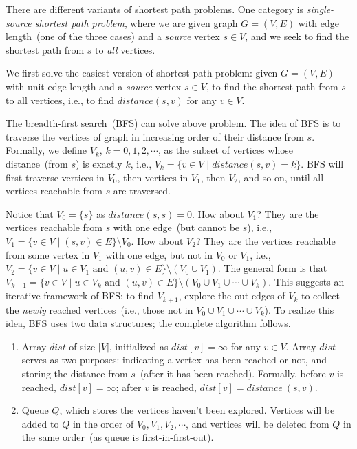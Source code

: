 There are different variants of shortest path problems.
One category is \emph{single-source shortest path problem}, where
we are given graph $G = (V, E)$ with edge length~(one of the three cases)
and a \emph{source} vertex $s\in V$, and we seek to find the shortest
path from $s$ to \emph{all} vertices.


We first solve the easiest version of shortest path problem: 
given $G = (V, E)$ with unit edge length and a \emph{source} vertex $s\in V$,
to find the shortest path from $s$ to all vertices, i.e., to find $distance(s, v)$ for any $v\in V$.

The breadth-first search~(BFS) can solve above problem. The idea of BFS
is to traverse the vertices of graph in increasing order of their distance from $s$.
Formally, we define $V_k$, $k = 0, 1, 2, \cdots$, as the subset of
vertices whose distance~(from $s$) is exactly $k$, i.e., $V_k = \{v \in V \mid distance(s, v) = k\}$.
BFS will first traverse vertices in $V_0$, then vertices in $V_1$, then $V_2$, and so on,
until all vertices reachable from $s$ are traversed.

Notice that $V_0 = \{s\}$ as $distance(s, s) = 0$.
How about $V_1$? They are the vertices reachable from $s$ with one edge~(but cannot be $s$), i.e., $V_1 = \{v \in V \mid (s, v) \in E\}\setminus V_0$.
How about $V_2$? They are the vertices reachable from some vertex in $V_1$ with one edge, but not in $V_0$ or $V_1$, i.e., $V_2 = \{v \in V \mid u\in V_1 \textrm{ and } (u, v) \in E\} \setminus (V_0\cup V_1)$.
The general form is that $V_{k + 1} = \{v \in V \mid u \in V_k \textrm{ and } (u, v) \in E\} \setminus (V_0\cup V_1 \cup \cdots \cup V_k)$.
This suggests an iterative framework of BFS: to find $V_{k+1}$, explore the out-edges of $V_k$ to collect the \emph{newly} reached 
vertices~(i.e., those not in $V_0\cup V_1 \cup \cdots \cup V_k$).
To realize this idea, BFS uses two data structures; the complete algorithm follows. 
\vspace*{-\topsep}
\begin{enumerate}
\item Array $dist$ of size $|V|$, initialized as $dist[v] = \infty$ for any $v\in V$.
Array $dist$ serves as two purposes: indicating a vertex has been reached or not,
and storing the distance from $s$~(after it has been reached).
Formally, before $v$ is reached, $dist[v] = \infty$;
after $v$ is reached, $dist[v] = distance~(s, v)$.

\item Queue $Q$, which stores the vertices haven't been explored.
Vertices will be added to $Q$ in the order of $V_0, V_1, V_2, \cdots$,
and vertices will be deleted from $Q$ in the same order~(as queue is first-in-first-out).
\end{enumerate}

